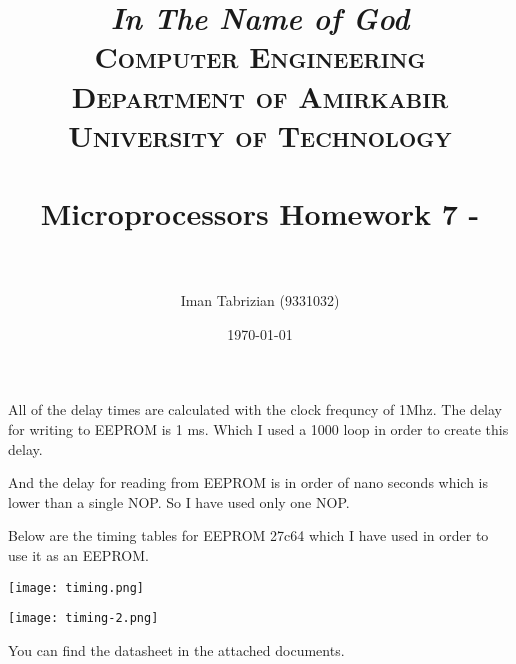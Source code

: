 \documentclass[paper=a4, fontsize=11pt]{scrartcl} %
\title{
\normalfont \normalsize
\textit{In The Name of God} \\ \textsc{Computer Engineering Department of Amirkabir University of Technology} \\ [25pt] \horrule{0.5pt} \\[0.4cm] %
\huge Microprocessors Homework 7 -  \\ %
\horrule{2pt} \\[0.5cm] %
}
\author{Iman Tabrizian (9331032)}
\date{\normalsize\today}
\numberwithin{equation}{section} %
\numberwithin{figure}{section} %
\numberwithin{table}{section} %
\begin{document}
\maketitle
\par All of the delay times are calculated with the clock frequncy of 1Mhz.
The delay for writing to EEPROM is 1 ms. Which I used a 1000 loop in order to
create this delay.

And the delay for reading from EEPROM is in order of nano seconds which is
lower than a single NOP. So I have used only one NOP.

Below are the timing tables for EEPROM 27c64 which I have used in order to
use it as an EEPROM.

\texttt{[image: timing.png]}

\texttt{[image: timing-2.png]}

You can find the datasheet in the attached documents.
\end{document}
